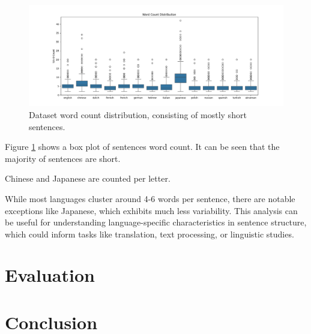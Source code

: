 \documentclass[a4paper]{article}
\begin{document}
\begin{figure}[htbp]
    \centering
    \includegraphics[width=1\linewidth]{figures/word_count_box.png}
    \caption{Dataset word count distribution, consisting of mostly short sentences.}
    \label{fig:word_count_box}
\end{figure}

Figure \ref{fig:word_count_box} shows a box plot of sentences word count. It can be seen that the majority of sentences are short.

Chinese and Japanese are counted per letter.

While most languages cluster around 4-6 words per sentence, there are notable exceptions like Japanese, which exhibits much less variability. This analysis can be useful for understanding language-specific characteristics in sentence structure, which could inform tasks like translation, text processing, or linguistic studies.

\section{Evaluation}

\section{Conclusion}


\printbibliography
\end{document}
